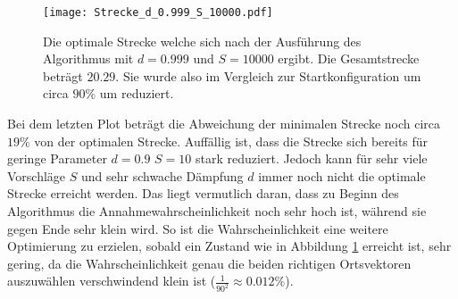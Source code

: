 \FloatBarrier
\noindent
\FloatBarrier
\begin{figure}[H]
    \centering
    \texttt{[image: Strecke\_d\_0.999\_S\_10000.pdf]}
    \caption{Die optimale Strecke welche sich nach der Ausführung des Algorithmus mit $d=0.999$ und $S=10000$ ergibt. 
    Die Gesamtstrecke beträgt $20.29$. Sie wurde also im Vergleich zur Startkonfiguration um circa $90\%$ um reduziert.}
    \label{fig:3_6}
\end{figure}
\FloatBarrier
\noindent
Bei dem letzten Plot beträgt die Abweichung der minimalen Strecke noch circa $19\%$ von der optimalen Strecke.
Auffällig ist, dass die Strecke sich bereits für geringe Parameter $d=0.9$ $S=10$ stark reduziert.
Jedoch kann für sehr viele Vorschläge $S$ und sehr schwache Dämpfung $d$ immer noch nicht die optimale Strecke erreicht werden.
Das liegt vermutlich daran, dass zu Beginn des Algorithmus die Annahmewahrscheinlichkeit noch sehr hoch ist, während sie gegen Ende sehr klein wird.
So ist die Wahrscheinlichkeit eine weitere Optimierung zu erzielen, sobald ein Zustand wie in Abbildung \ref{fig:3_6} erreicht ist, sehr gering, da die Wahrscheinlichkeit genau die beiden richtigen Ortsvektoren auszuwählen verschwindend klein ist ($\frac{1}{90^2} \approx 0.012\%$).



